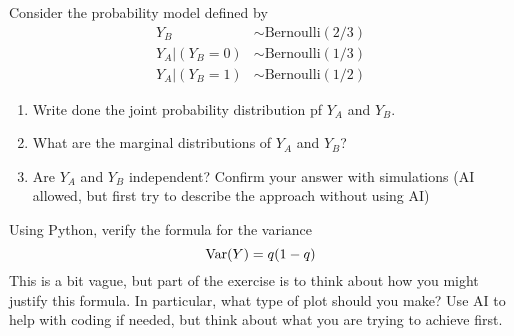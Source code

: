 \begin{exercise}
Consider the probability model defined by
\begin{align*}
Y_B &\sim \text{Bernoulli}(2/3) \\
Y_A|(Y_B=0) &\sim \text{Bernoulli}(1/3) \\
Y_A|(Y_B=1) &\sim \text{Bernoulli}(1/2)
\end{align*}

\begin{enumerate}[label=(\alph*)]
\item Write done the joint probability distribution pf $Y_A$ and $Y_B$. 
\item What are the marginal distributions of $Y_A$ and $Y_B$?
\item Are $Y_A$ and $Y_B$ independent? Confirm your answer with simulations (AI allowed, but first try to describe the approach without using AI)
\end{enumerate}
%

\end{exercise}


\begin{exercise}
Using Python, verify the formula for the variance
\begin{equation*}
{\rm Var}(Y) = q(1-q)
\end{equation*}
This is a bit vague, but part of the exercise is to think about how you might justify this formula. In particular, what type of plot should you make? Use AI to help with coding if needed, but think about what you are trying to achieve first. 
\end{exercise}

